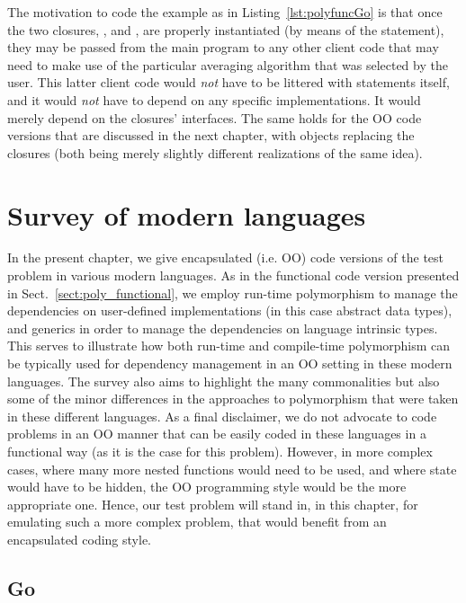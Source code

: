 \documentclass[11pt,oneside]{report}
\newcommand{\code}[1]{{\selectfont\ttfamily{#1}}}
\begin{document}


The motivation to code the example as in Listing~\ref{lst:polyfuncGo}
is that once the two closures, \code{avi}, and \code{avf}, are properly
instantiated (by means of the \code{switch} statement), they may be
passed from the main program to any other client code that may need to
make use of the particular averaging algorithm that was selected by
the user. This latter client code would \emph{not} have to be littered
with \code{switch} statements itself, and it would \emph{not} have to
depend on any specific implementations. It would merely depend on the
closures' interfaces. The same holds for the OO code versions that are
discussed in the next chapter, with objects replacing the closures
(both being merely slightly different realizations of the same idea).

\chapter{Survey of modern languages}
\label{sect:survey}

In the present chapter, we give encapsulated (i.e. OO) code versions
of the test problem in various modern languages. As in the functional
code version presented in Sect.~\ref{sect:poly_functional}, we employ
run-time polymorphism to manage the dependencies on user-defined
implementations (in this case abstract data types), and generics in
order to manage the dependencies on language intrinsic types. This
serves to illustrate how both run-time and compile-time polymorphism
can be typically used for dependency management in an OO setting in
these modern languages. The survey also aims to highlight the many
commonalities but also some of the minor differences in the approaches
to polymorphism that were taken in these different languages. As a
final disclaimer, we do not advocate to code problems in an OO manner
that can be easily coded in these languages in a functional way (as it
is the case for this problem). However, in more complex cases, where
many more nested functions would need to be used, and where state
would have to be hidden, the OO programming style would be the more
appropriate one. Hence, our test problem will stand in, in this
chapter, for emulating such a more complex problem, that would
benefit from an encapsulated coding style.


\section{Go}
\end{document}
